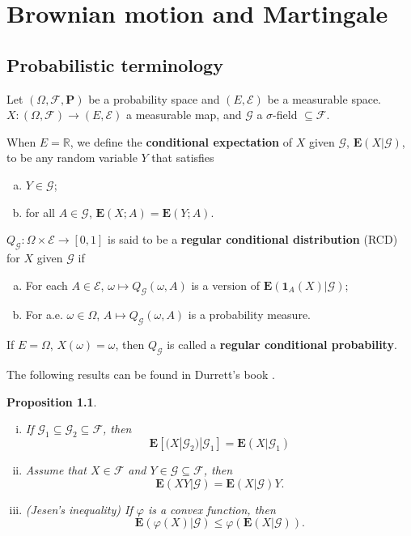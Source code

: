 \documentclass[twoside, 12pt]{book}
\numberwithin{equation}{chapter}
\newtheorem{proposition}[theorem]{Proposition}
\def\cE{{\mathcal E}}
\def\cF{{\mathcal F}}
\def\cG{{\mathcal G}}
\def\mR{{\mathbb R}}
\def\bE{{\mathbf E}}
\def\bP{{\mathbf P}}
\def\leq{\leqslant}
\def\1{{\mathbf{1}}}
\begin{document}
	\chapter{Brownian motion and Martingale}\label{chapt:BM}
	
	\section{Probabilistic terminology}
	
	Let $(\Omega, \cF, \bP)$ be a probability space and $(E, \cE)$ be a measurable space. $X:(\Omega,\cF)\to (E, \cE)$ a measurable map, and $\cG$ a $\sigma$-field $\subseteq \cF$.  
	
	When $E=\mR$, we define the {\bf conditional expectation} of $X$ given $\cG$, $\bE(X|\cG)$, to be any random variable $Y$ that satisfies 
	\begin{enumerate}[(a)]
		\item $Y\in \cG$; 
		\item for all $A\in \cG$, $\bE(X; A)=\bE(Y; A)$. 
	\end{enumerate}
	
	$Q_{\cG}: \Omega\times \cE\to [0,1]$ is said to be a {\bf {regular conditional distribution}} (RCD) for $X$ given $\cG$ if 
	\begin{enumerate}[(a)]
		\item For each $A\in \cE$, $\omega\mapsto Q_{\cG}(\omega, A)$ is a version of $\bE(\1_A(X)|\cG)$; 
		\item For a.e. $\omega\in \Omega$, $A\mapsto Q_{\cG}(\omega, A)$ is a probability measure. 
	\end{enumerate}
	If $E=\Omega$, $X(\omega)=\omega$, then $Q_{\cG}$ is called a {\bf regular conditional probability}. 
	
	The following results can be found in Durrett's book \cite{durrett2019probability}.  
	\begin{proposition}
		\begin{enumerate}[(i)]
			\item If $\cG_1\subseteq \cG_2\subseteq \cF$, then 
			\begin{equation}
				\bE[(X|\cG_2)|\cG_1]=\bE (X|\cG_1)
			\end{equation}
			\item Assume that $X\in \cF$ and $Y\in \cG\subseteq \cF$, then 
			\begin{equation}
				\bE (XY|\cG)=\bE (X|\cG)Y. 
			\end{equation}
			\item (Jesen's inequality) If $\varphi$ is a convex function, then 
			\begin{equation}
				\bE (\varphi(X)|\cG) \leq \varphi(\bE (X|\cG)). 
			\end{equation}
		\end{enumerate}
	\end{proposition}
	
\end{document}
